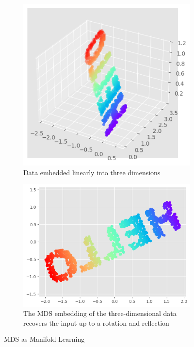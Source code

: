 \begin{figure}
    \centering
    \begin{subfigure}[b]{.45\textwidth}
        \includegraphics[width=\textwidth]{../img/fig46-5.png}
        \caption{Data embedded linearly into three dimensions}
    \end{subfigure}
    \hfill
    \begin{subfigure}[b]{.45\textwidth}
        \includegraphics[width=\textwidth]{../img/fig46-6.png}
        \caption{The MDS embedding of the three-dimensional data recovers the input up to a rotation and reflection}
    \end{subfigure}
    \caption{MDS as Manifold Learning}
\end{figure}

